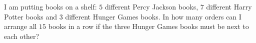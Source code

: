 I am putting books on a shelf: $5$ different Percy Jackson books, $7$ different Harry Potter books and $3$ different Hunger Games books. In how many orders can I arrange all $15$ books in a row if the three Hunger Games books must be next to each other?
